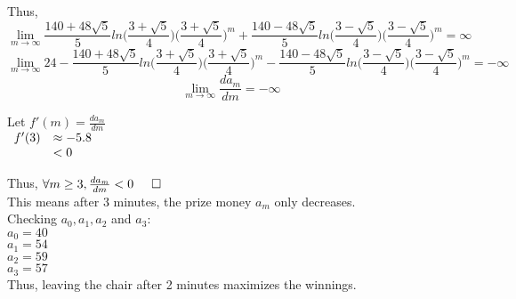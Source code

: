 \documentclass[a4paper, 11pt]{article}
\begin{document}
\begin{myEnumerate}
\begin{myEnumerate}
        Thus,
        $$ \lim_{m \to \infty} \frac{140 + 48\sqrt{5}}{5} ln \Big( \frac{3+\sqrt{5}}{4} \Big) \Big( \frac{3+\sqrt{5}}{4} \Big)^m + \frac{140 - 48\sqrt{5}}{5} ln \Big( \frac{3-\sqrt{5}}{4} \Big) \Big( \frac{3-\sqrt{5}}{4} \Big)^m = \infty $$
        $$ \lim_{m \to \infty} 24 - \frac{140 + 48\sqrt{5}}{5} ln \Big( \frac{3+\sqrt{5}}{4} \Big) \Big( \frac{3+\sqrt{5}}{4} \Big)^m - \frac{140 - 48\sqrt{5}}{5} ln \Big( \frac{3-\sqrt{5}}{4} \Big) \Big( \frac{3-\sqrt{5}}{4} \Big)^m = - \infty $$
        $$ \lim_{m \to \infty} \frac{da_m}{dm} = - \infty $$
        
        Let $f'(m) = \frac{da_m}{dm}$ \\
        
        \(
        \begin{array}{ll}
        	f'(3) & \approx -5.8 \\
            	  & < 0
        \end{array} \\ \)
        
        Thus, $\forall m \geq 3, \frac{da_m}{dm} < 0 \hspace{0.5cm} \square$ \\
        
        This means after 3 minutes, the prize money $a_m$ only decreases. \\        
        Checking $a_0, a_1, a_2$ and $a_3$: \\
        $a_0 = 40$ \\
        $a_1 = 54$ \\
        $a_2 = 59$ \\
        $a_3 = 57$ \\
        
        Thus, leaving the chair after 2 minutes maximizes the winnings.
        
    \end{myEnumerate}

\end{myEnumerate}
\end{document}

